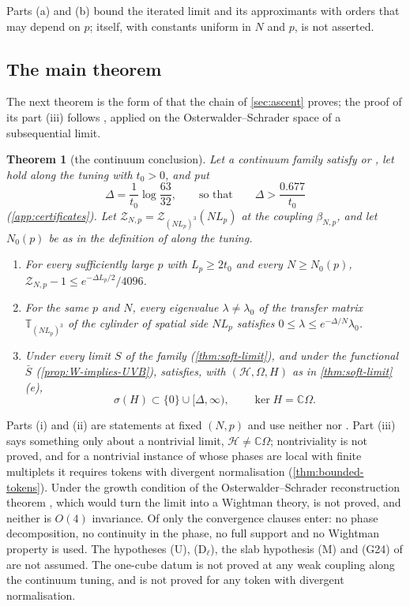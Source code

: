 \documentclass[11pt,a4paper]{amsart}
\newtheorem{theorem}{Theorem}[section]
\theoremstyle{definition}
\theoremstyle{remark}
\numberwithin{equation}{section}
\newcommand{\C}{\mathbb{C}}          %
\newcommand{\Hilb}{\mathcal{H}}      %
\newcommand{\TT}{\mathbb{T}}               %
\newcommand{\Zc}{\mathcal{Z}}              %
\newcommand{\Zs}[2]{\Zc_{#1}(#2)}          %
\newcommand{\lzero}{\lambda_0}             %
\newcommand{\Mcirc}{\text{\upshape(M$^{\circ}$)}}   %
\newcommand{\hypW}{\text{\upshape(W)}}              %
\newcommand{\UVB}{\text{\upshape(UVB)}}             %
\newcommand{\tzero}{t_0}                   %
\newcommand{\Lp}{L_p}                      %
\newcommand{\betaNp}{\beta_{N,p}}          %
\begin{document}
Parts (a) and (b) bound the iterated limit and its approximants with orders that may depend on $p$; \UVB{} itself, with constants uniform in $N$ and $p$, is not asserted.

\subsection{The main theorem}

The next theorem is the form of \cite[Theorem~F]{bhattacharjee2026first} that the chain of \cref{sec:ascent} proves; the proof of its part (iii) follows \cite[Proposition~4 and Corollary~2]{bhattacharjee2026first}, applied on the Osterwalder--Schrader space of a subsequential limit.

\begin{theorem}[the continuum conclusion]\label{thm:main}
Let a continuum family satisfy \UVB{} or \hypW, let \Mcirc{} hold along the tuning with $\tzero>0$, and put
\[
\Delta=\frac{1}{\tzero}\log\frac{63}{32},\qquad\text{so that}\qquad\Delta>\frac{0.677}{\tzero}
\]
(\cref{app:certificates}). Let $\Zc_{N,p}=\Zs{(N\Lp)^3}{N\Lp}$ at the coupling $\betaNp$, and let $N_0(p)$ be as in the definition of \Mcirc{} along the tuning.
\begin{enumerate}[label=(\roman*),leftmargin=2.2em]
\item For every sufficiently large $p$ with $\Lp\ge2\tzero$ and every $N\ge N_0(p)$, $\Zc_{N,p}-1\le e^{-\Delta\Lp/2}/4096$.
\item For the same $p$ and $N$, every eigenvalue $\lambda\ne\lzero$ of the transfer matrix $\TT_{(N\Lp)^3}$ of the cylinder of spatial side $N\Lp$ satisfies $0\le\lambda\le e^{-\Delta/N}\lzero$.
\item Under \UVB{} every limit $S$ of the family (\cref{thm:soft-limit}), and under \hypW{} the functional $\bar S$ (\cref{prop:W-implies-UVB}), satisfies, with $(\Hilb,\Omega,H)$ as in \cref{thm:soft-limit}(e),
\[
\sigma(H)\subset\{0\}\cup[\Delta,\infty),\qquad\ker H=\C\Omega .
\]
\end{enumerate}
\end{theorem}

Parts (i) and (ii) are statements at fixed $(N,p)$ and use neither \UVB{} nor \hypW. Part (iii) says something only about a nontrivial limit, $\Hilb\ne\C\Omega$; nontriviality is not proved, and for a nontrivial instance of \hypW{} whose phases are local with finite multiplets it requires tokens with divergent normalisation (\cref{thm:bounded-tokens}). Under \UVB{} the growth condition of the Osterwalder--Schrader reconstruction theorem \cite{osterwalder1975}, which would turn the limit into a Wightman theory, is not proved, and neither is $O(4)$ invariance. Of \hypW{} only the convergence clauses enter: no phase decomposition, no continuity in the phase, no full support and no Wightman property is used. The hypotheses \textup{(U)}, \textup{(D$_\ell$)}, the slab hypothesis \textup{(M)} and \textup{(G24)} of \cite{bhattacharjee2026first} are not assumed. The one-cube datum \Mcirc{} is not proved at any weak coupling along the continuum tuning, and \UVB{} is not proved for any token with divergent normalisation.
\end{document}
